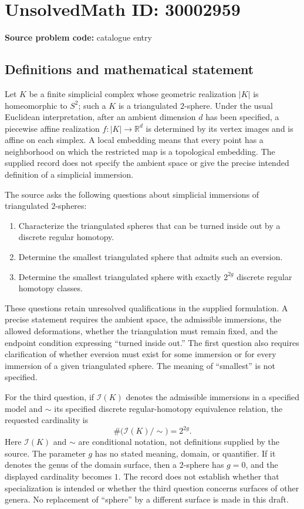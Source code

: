 \documentclass[11pt]{article}
\newcommand{\R}{\mathbb{R}}
\begin{document}
\section*{UnsolvedMath ID: 30002959}
\textbf{Source problem code:} catalogue entry
\subsection{Definitions and mathematical statement}
Let \(K\) be a finite simplicial complex whose geometric realization \(|K|\) is homeomorphic to \(S^2\); such a \(K\) is a triangulated \(2\)-sphere. Under the usual Euclidean interpretation, after an ambient dimension \(d\) has been specified, a piecewise affine realization \(f\colon |K|\to\R^d\) is determined by its vertex images and is affine on each simplex. A local embedding means that every point has a neighborhood on which the restricted map is a topological embedding. The supplied record does not specify the ambient space or give the precise intended definition of a simplicial immersion.

The source asks the following questions about simplicial immersions of triangulated \(2\)-spheres:
\begin{enumerate}
\item Characterize the triangulated spheres that can be turned inside out by a discrete regular homotopy.
\item Determine the smallest triangulated sphere that admits such an eversion.
\item Determine the smallest triangulated sphere with exactly \(2^{2g}\) discrete regular homotopy classes.
\end{enumerate}

These questions retain unresolved qualifications in the supplied formulation. A precise statement requires the ambient space, the admissible immersions, the allowed deformations, whether the triangulation must remain fixed, and the endpoint condition expressing ``turned inside out.'' The first question also requires clarification of whether eversion must exist for some immersion or for every immersion of a given triangulated sphere. The meaning of ``smallest'' is not specified.

For the third question, if \(\mathcal I(K)\) denotes the admissible immersions in a specified model and \(\sim\) its specified discrete regular-homotopy equivalence relation, the requested cardinality is
\[
\#\bigl(\mathcal I(K)/{\sim}\bigr)=2^{2g}.
\]
Here \(\mathcal I(K)\) and \(\sim\) are conditional notation, not definitions supplied by the source. The parameter \(g\) has no stated meaning, domain, or quantifier. If it denotes the genus of the domain surface, then a \(2\)-sphere has \(g=0\), and the displayed cardinality becomes \(1\). The record does not establish whether that specialization is intended or whether the third question concerns surfaces of other genera. No replacement of ``sphere'' by a different surface is made in this draft.
\end{document}
